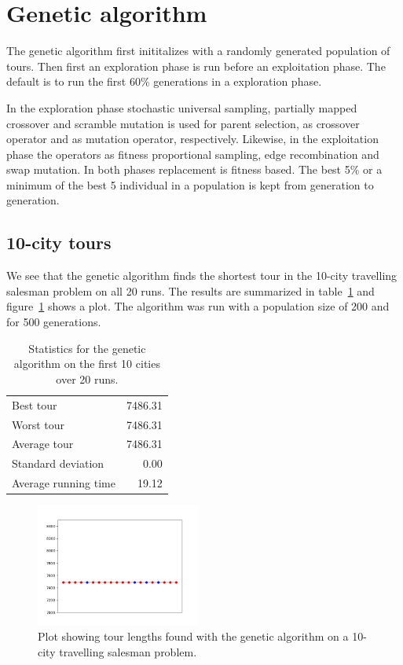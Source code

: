 \documentclass[a4paper]{article}
\begin{document}
\section*{Genetic algorithm}

The genetic algorithm first inititalizes with a randomly generated
population of tours. Then first an exploration phase is run before
an exploitation phase. The default is to run the first 60\%
generations in a exploration phase.

In the exploration phase stochastic universal sampling, partially
mapped crossover and scramble mutation is used for parent selection,
as crossover operator and as mutation operator, respectively.
Likewise, in the exploitation phase the operators as fitness proportional
sampling, edge recombination and swap mutation. In both phases replacement
is fitness based. The best 5\% or a minimum of the best 5 individual in a
population is kept from generation to generation.

\subsection*{10-city tours}

We see that the genetic algorithm finds the shortest tour in the
10-city travelling salesman problem on all 20 runs. The results are
summarized in table~\ref{tab:ga10} and figure~\ref{fig:ga10} shows
a plot. The algorithm was run with a population size of 200 and for
500 generations.

\begin{table}[h]
  \centering
  \begin{tabular}{lr}
    Best tour & 7486.31 \\
    Worst tour & 7486.31 \\
    Average tour & 7486.31 \\
    Standard deviation & 0.00 \\
    Average running time & 19.12 \\
  \end{tabular}
  \caption{Statistics for the genetic algorithm on
    the first 10 cities over 20 runs.}
  \label{tab:ga10}
\end{table}

\begin{figure}[h]
  \centering
  \includegraphics[width=0.48\textwidth]{genetic_10.png}
  \caption{Plot showing tour lengths found with the genetic algorithm
    on a 10-city travelling salesman problem.}
  \label{fig:ga10}
\end{figure}
\end{document}

